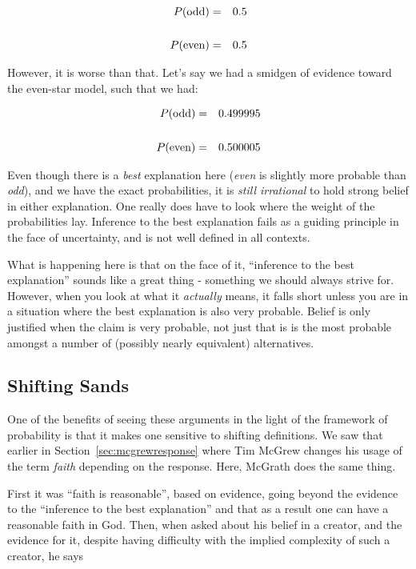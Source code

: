 \begin{eqnarray}
P({\rm odd}) &=&0.5 \\\\
P({\rm even})&=&0.5
\end{eqnarray}

However, it is worse than that. Let's say we had a smidgen of evidence
toward the even-star model, such that we had:

\begin{eqnarray}
P({\rm odd}) &=&0.499995 \\\\
P({\rm even})&=&0.500005
\end{eqnarray}

Even though there is a \emph{best} explanation here (\emph{even} is
slightly more probable than \emph{odd}), and we have the exact
probabilities, it is \emph{still irrational} to hold strong belief in
either explanation. One really does have to look where the weight of the
probabilities lay. Inference to the best explanation fails as a guiding
principle in the face of uncertainty, and is not well defined in all
contexts. 

What is happening here is that on the face of it, ``inference to the best explanation'' sounds like a great thing - something we should always strive for.  However, when you look at what it {\em actually} means, it falls short unless you are in a situation where the best explanation is also very probable.  Belief is only justified when the claim is very probable, not just that is is the most probable amongst a number of (possibly nearly equivalent) alternatives.


\subsection{Shifting Sands}\label{playing-dodgeball-with-an-apologist}

One of the benefits of seeing these arguments in the light of the framework of probability is that it makes one sensitive to shifting definitions.  We saw that earlier in Section~\ref{sec:mcgrewresponse} where Tim McGrew changes his usage of the term {\em faith} depending on the response.  Here, McGrath does the same thing.

First it was ``faith is reasonable'', based on evidence, going beyond the evidence to the ``inference to the best explanation'' and that as a result one can have a reasonable faith in God.  Then, when asked about his belief in a creator, and the evidence for it,  despite having difficulty with the implied complexity of such a creator, he says

